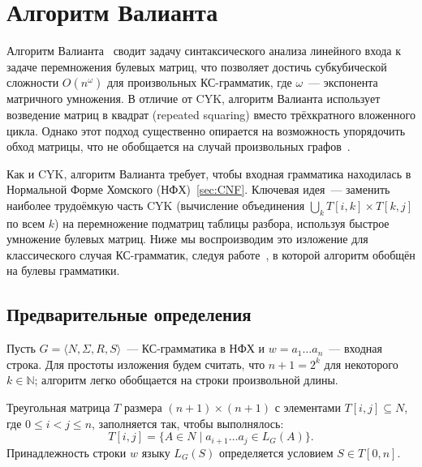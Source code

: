\section{Алгоритм Валианта}
\label{sec:Valiant}


Алгоритм Валианта~ сводит задачу синтаксического анализа линейного входа к задаче перемножения булевых матриц, что позволяет достичь субкубической сложности $O(n^\omega)$ для произвольных КС-грамматик, где $\omega$~--- экспонента матричного умножения.
В отличие от CYK, алгоритм Валианта использует возведение матриц в квадрат (repeated squaring) вместо трёхкратного вложенного цикла.
Однако этот подход существенно опирается на возможность упорядочить обход матрицы, что не обобщается на случай произвольных графов~.

Как и CYK, алгоритм Валианта требует, чтобы входная грамматика находилась в Нормальной Форме Хомского (НФХ)~\ref{sec:CNF}.
Ключевая идея~--- заменить наиболее трудоёмкую часть CYK (вычисление объединения $\bigcup_{k} T[i,k] \times T[k,j]$ по всем $k$) на перемножение подматриц таблицы разбора, используя быстрое умножение булевых матриц.
Ниже мы воспроизводим это изложение для классического случая КС-грамматик, следуя работе~, в которой алгоритм обобщён на булевы грамматики.

\subsection{Предварительные определения}

Пусть $G = \langle N, \Sigma, R, S \rangle$~--- КС-грамматика в НФХ и $w = a_1 \dots a_{n}$~--- входная строка.
Для простоты изложения будем считать, что $n + 1 = 2^k$ для некоторого $k \in \mathbb{N}$; алгоритм легко обобщается на строки произвольной длины.

\begin{definition}
  Треугольная матрица $T$ размера $(n + 1) \times (n + 1)$ с элементами $T[i,j] \subseteq N$, где $0 \leqslant i < j \leqslant n$, заполняется так, чтобы выполнялось:
  \[
    T[i,j] = \{A \in N \mid a_{i+1} \dots a_{j} \in L_G(A)\}.
  \]
  Принадлежность строки $w$ языку $L_G(S)$ определяется условием $S \in T[0,n]$.
\end{definition}

